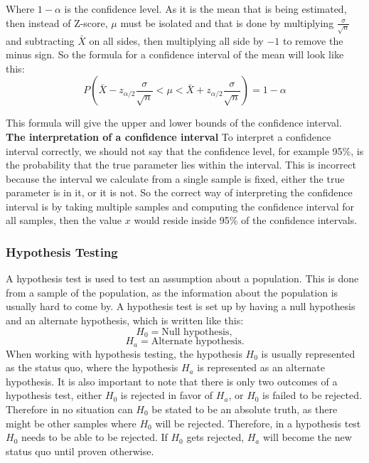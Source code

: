 \noindent Where $1-\alpha$ is the confidence level. As it is the mean that is being estimated, then instead of Z-score, $\mu$ must be isolated and that is done by multiplying $\frac{\sigma}{\sqrt{n}}$ and subtracting $\bar{X}$ on all sides, then multiplying all side by $-1$ to remove the minus sign. So the formula for a confidence interval of the mean will look like this:
\begin{equation}
P(\bar{X}-z_{\alpha/2}\frac{\sigma}{\sqrt{n}}<\mu<\bar{X}+z_{\alpha/2}\frac{\sigma}{\sqrt{n}})=1-\alpha
\end{equation}

\noindent This formula will give the upper and lower bounds of the confidence interval.\\

\noindent \textbf{The interpretation of a confidence interval}
\newline
To interpret a confidence interval correctly, we should not say that the confidence level, for example 95\%, is the probability that the true parameter lies within the interval. This is incorrect because the interval we calculate from a single sample is fixed, either the true parameter is in it, or it is not. So the correct way of interpreting the confidence interval is by taking multiple samples and computing the confidence interval for all samples, then the value $x$ would reside inside 95\% of the confidence intervals.\cite{ProbAndStat_8th}


\subsubsection{Hypothesis Testing}
A hypothesis test is used to test an assumption about a population. This is done from a sample of the population, as the information about the population is usually hard to come by. A hypothesis test is set up by having a null hypothesis and an alternate hypothesis, which is written like this:
$$H_0 = \text{Null hypothesis},$$
$$H_a = \text{Alternate hypothesis}.$$
When working with hypothesis testing, the hypothesis $H_0$ is usually represented as the status quo, where the hypothesis $H_a$ is represented as an alternate hypothesis. It is also important to note that there is only two outcomes of a hypothesis test, either $H_0$ is rejected in favor of $H_a$, or $H_0$ is failed to be rejected. Therefore in no situation can $H_0$ be stated to be an absolute truth, as there might be other samples where $H_0$ will be rejected. Therefore, in a hypothesis test $H_0$ needs to be able to be rejected. If $H_0$ gets rejected, $H_a$ will become the new status quo until proven otherwise.\\

